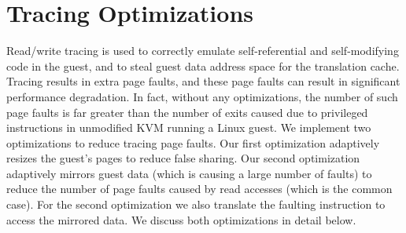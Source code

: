 \chapter{Tracing Optimizations}\label{ch:5}
Read/write tracing is used to correctly emulate self-referential and self-modifying code in the guest, and to steal guest data address space for the translation cache. Tracing results in extra page faults, and these page faults can result in significant performance degradation. In fact, without any optimizations, the number of such page faults is far greater than the number of exits caused due to privileged instructions in unmodified KVM running a Linux guest.
We implement two optimizations to reduce tracing page faults. Our first optimization adaptively resizes the guest’s pages to reduce false sharing. Our second optimization adaptively mirrors guest data (which is causing a large number of faults) to reduce the number of page faults caused by read accesses (which is the common case). For the second optimization we also translate the faulting instruction to access the mirrored data. We discuss both optimizations in detail below.

